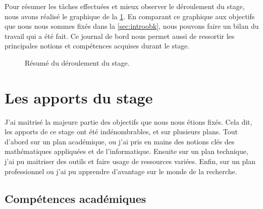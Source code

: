 \vspace*{0.50cm}
Pour résumer les tâches effectuées et mieux observer le déroulement du stage, nous avons réalisé le graphique de la \cref{fig:timeline}. En comparant ce graphique aux objectifs que nous nous sommes fixés dans la \cref{sec:introobk}, nous pouvons faire un bilan du travail qui a été fait. Ce journal de bord nous permet aussi de ressortir les principales notions et compétences acquises durant le stage.

\begin{figure}[!h]
    \centering
    \caption{Résumé du déroulement du stage.}
    \label{fig:timeline}
\end{figure}








\section{Les apports du stage}


J'ai maitrisé la majeure partie des objectifs que nous nous étions fixés. Cela dit, les apports de ce stage ont été indénombrables, et sur plusieurs plans. Tout d'abord sur un plan académique, ou j'ai pris en mains des notions clés des mathématiques appliquées et de l'informatique. Ensuite sur un plan technique, j'ai pu maitriser des outils et faire usage de ressources variées. Enfin, sur un plan professionnel ou j'ai pu apprendre d'avantage sur le monde de la recherche.



\subsection{Compétences académiques}

